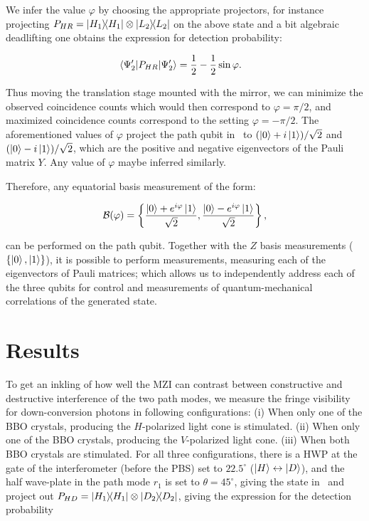 \noindent
We infer the value $\varphi$ by choosing the appropriate projectors, for instance projecting $P_{HR} = \op{H_1}\otimes\op{L_2}$ on the above state and a bit algebraic deadlifting one obtains the expression for detection probability:

\begin{align}
	&\ev{P_{HR}}{\Psi_2'} = \frac{1}{2} - \frac{1}{2}\sin{\varphi}.
\end{align}

\noindent
Thus moving the translation stage mounted with the mirror, we can minimize the observed coincidence counts which would then correspond to $\varphi = \pi/2$, and maximized coincidence counts correspond to the setting $\varphi = - \pi/2$. The aforementioned values of $\varphi$ project the path qubit in~ to $(\ket{0}+i\ket{1})/\sqrt{2}$ and $(\ket{0}-i\ket{1})/\sqrt{2}$, which are the positive and negative eigenvectors of the Pauli matrix $Y$. Any value of $\varphi$ maybe inferred similarly. 


\clearpage
\noindent
Therefore, any equatorial basis measurement of the form:

\begin{align}
	\mathcal{B}(\varphi) = \left\{\frac{\ket{0} + e^{i\varphi}\ket{1}}{\sqrt{2}}, \frac{\ket{0} - e^{i\varphi}\ket{1}}{\sqrt{2}} \right\},
\end{align}

\noindent
can be performed on the path qubit. Together with the $Z$ basis measurements ($\{\ket{0}, \ket{1}\}$), it is possible to perform measurements, measuring each of the eigenvectors of Pauli matrices; which allows us to independently address each of the three qubits for control and measurements of quantum-mechanical correlations of the generated state.

\section{Results}

To get an inkling of how well the \acs{MZI} can contrast between constructive and destructive interference of the two path modes, we measure the fringe visibility for down-conversion photons in following configurations: (i) When only one of the \acs{BBO} crystals, producing the $H$-polarized light cone is stimulated. (ii) When only one of the \acs{BBO} crystals, producing the $V$-polarized light cone. (iii) When both \acs{BBO} crystals are stimulated. For all three configurations, there is a \acs{HWP} at the gate of the interferometer (before the PBS) set to $22.5^{\circ}$ ($\ket{H} \leftrightarrow \ket{D}$), and the half wave-plate in the path mode $r_1$ is set to $\theta=45^{\circ}$, giving the state in~ and project out $P_{HD} = \op{H_1}\otimes\op{D_2}$, giving the expression for the detection probability 

